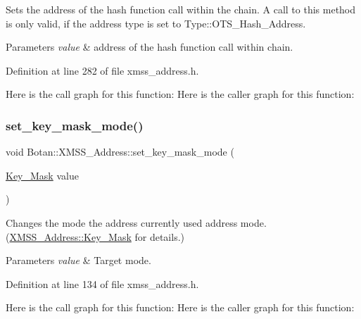 Sets the address of the hash function call within the chain. A call to this method is only valid, if the address type is set to Type\+::\+O\+T\+S\+\_\+\+Hash\+\_\+\+Address.


\begin{DoxyParams}{Parameters}
{\em value} & address of the hash function call within chain. \\
\hline
\end{DoxyParams}


Definition at line 282 of file xmss\+\_\+address.\+h.

Here is the call graph for this function\+:
Here is the caller graph for this function\+:
\mbox{\label{class_botan_1_1_x_m_s_s___address_a12a0bcf65685053363b944be811f57db}} 
\subsubsection{\texorpdfstring{set\+\_\+key\+\_\+mask\+\_\+mode()}{set\_key\_mask\_mode()}}
{\footnotesize\ttfamily void Botan\+::\+X\+M\+S\+S\+\_\+\+Address\+::set\+\_\+key\+\_\+mask\+\_\+mode (\begin{DoxyParamCaption}\item[{\mbox{\hyperlink{class_botan_1_1_x_m_s_s___address_a85146c0c3e049f62c413194049f501e3}{Key\+\_\+\+Mask}}}]{value }\end{DoxyParamCaption})\hspace{0.3cm}{\ttfamily [inline]}}

Changes the mode the address currently used address mode. (\mbox{\hyperlink{class_botan_1_1_x_m_s_s___address_a85146c0c3e049f62c413194049f501e3}{X\+M\+S\+S\+\_\+\+Address\+::\+Key\+\_\+\+Mask}} for details.)


\begin{DoxyParams}{Parameters}
{\em value} & Target mode. \\
\hline
\end{DoxyParams}


Definition at line 134 of file xmss\+\_\+address.\+h.

Here is the call graph for this function\+:
Here is the caller graph for this function\+:
\mbox{\label{class_botan_1_1_x_m_s_s___address_aca1e7f785ce8f328bd108c9cd63bde11}} 

